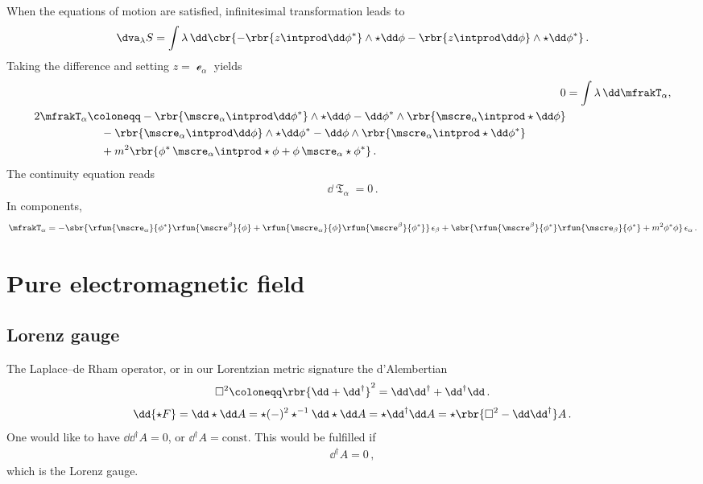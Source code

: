 \documentclass[a4paper]{article}
\begin{document}
When the equations of motion are satisfied, infinitesimal 
transformation leads to
\begin{align}
\dva_{\lambda} S = \int \lambda\,\dd\cbr{
	-\rbr{z\intprod\dd\phi^*}\wedge\star\dd\phi
	-\rbr{z\intprod\dd\phi}\wedge\star\dd\phi^*}\,.
\end{align}
Taking the difference and setting $z = \mscre_{\alpha}$ yields
\begin{align}
0 &= \int \lambda\,\dd \mfrakT_{\alpha}, \\
\begin{split}
2 \mfrakT_{\alpha} &\coloneqq
-\rbr{\mscre_{\alpha}\intprod\dd\phi^*}\wedge\star\dd\phi -
\dd\phi^*\wedge\rbr{\mscre_{\alpha}\intprod\star\dd\phi}
\\
&\quad\,-
\rbr{\mscre_{\alpha}\intprod\dd\phi}\wedge\star\dd\phi^* -
\dd\phi\wedge\rbr{\mscre_{\alpha}\intprod\star\dd\phi^*}
\\
&\quad\,+
m^2\rbr{\phi^*\,\mscre_{\alpha}\intprod\star\phi +
	\phi\,\mscre_{\alpha}\star\phi^*}\,.
\end{split}
\end{align}
The continuity equation reads
\begin{align}
\dd \mfrakT_{\alpha} = 0\,.
\end{align}
In components,
\begin{align}
\mfrakT_{\alpha} =
-\sbr{\rfun{\mscre_{\alpha}}{\phi^*} \rfun{\mscre^{\beta}}{\phi}+
	\rfun{\mscre_{\alpha}}{\phi} \rfun{\mscre^{\beta}}{\phi^*}}\,
		\epsilon_{\beta} +
\sbr{\rfun{\mscre^{\beta}}{\phi^*} \rfun{\mscre_{\beta}}{\phi^*}
	+ m^2 \phi^* \phi}\, \epsilon_{\alpha}\,.
\end{align}

\section{Pure electromagnetic field}


\subsection{Lorenz gauge}
The Laplace--de Rham operator, or in our Lorentzian metric signature the 
d'Alembertian
\begin{align}
\square^2 \coloneqq \rbr{\dd + \dd^{\dagger}}^2 =
	\dd \dd^{\dagger} + \dd^{\dagger} \dd\,.
\end{align}
\begin{align}
\dd{\star F} = \dd\star \dd A = \star (-)^2 \star^{-1}\dd\star\dd A =
	\star \dd^{\dagger} \dd A = \star\rbr{\square^2 - \dd \dd^{\dagger}} A\,.
\end{align}
One would like to have $\dd \dd^{\dagger} A = 0$, or $\dd^{\dagger} A = 
\text{const}$. This would be fulfilled if
\begin{align}
\dd^{\dagger} A = 0\,,
\end{align}
which is the Lorenz gauge\cite{Lorenz1867,Bladel1991a,Bladel1991b}.
\end{document}
